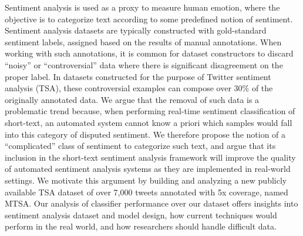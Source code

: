 Sentiment analysis is used as a proxy to measure human emotion, where the objective is to categorize text according to some predefined notion of sentiment. Sentiment analysis datasets are typically constructed with gold-standard sentiment labels, assigned based on the results of manual annotations. When working with such annotations, it is common for dataset constructors to discard ``noisy'' or ``controversial'' data where there is significant disagreement on the proper label. In datasets constructed for the purpose of Twitter sentiment analysis (TSA), these controversial examples can compose over 30\% of the originally annotated data. We argue that the removal of such data is a problematic trend because, when performing real-time sentiment classification of short-text, an automated system cannot know a priori which samples would fall into this category of disputed sentiment. We therefore propose the notion of a ``complicated'' class of sentiment to categorize such text, and argue that its inclusion in the short-text sentiment analysis framework will improve the quality of automated sentiment analysis systems as they are implemented in real-world settings. We motivate this argument by building and analyzing a new publicly available TSA dataset of over 7,000 tweets annotated with 5x coverage, named MTSA. Our analysis of classifier performance over our dataset offers insights into sentiment analysis dataset and model design, how current techniques would perform in the real world, and how researchers should handle difficult data.
